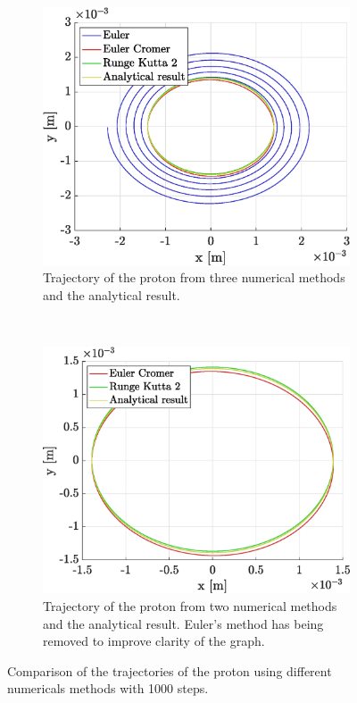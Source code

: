 \documentclass[a4paper,12pt,twoside]{article}
\begin{document}
\begin{figure}[h]
	\centering
	\begin{subfigure}[t]{0.45\textwidth}
	\includegraphics[width=\linewidth]{graphs/ex2_ii_traj_ALL.eps}
		\caption{Trajectory of the proton from three numerical methods and the analytical result.}
		\label{fig:ex2-ii-traj-all}
	\end{subfigure}
	~
	\begin{subfigure}[t]{0.45\textwidth}
		\includegraphics[width=\linewidth]{graphs/ex2_ii_traj_NoEuler}
		\caption{Trajectory of the proton from two numerical methods and the analytical result. Euler's method has being removed to improve clarity of the graph.}
		\label{fig:ex2-ii-traj-NoEuler}
	\end{subfigure}
	
	\caption{Comparison of the trajectories of the proton using different numericals methods with \num{1000} steps.}
	\label{fig:ex2-ii-traj}
\end{figure}
\end{document}
